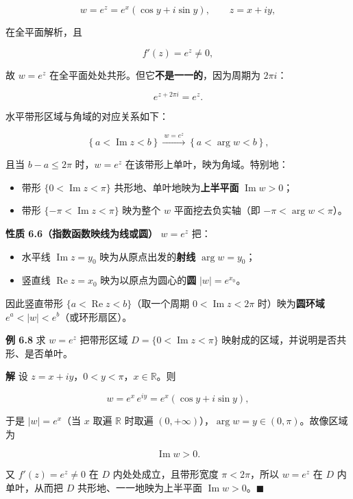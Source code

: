 \[
w=e^{z}=e^{x}(\cos y+i\sin y),\qquad z=x+iy,
\]

在全平面解析，且

\[
f'(z)=e^{z}\neq 0,
\]

故 \(w=e^z\) 在全平面处处共形。但它\textbf{不是一一的}，因为周期为
\(2\pi i\)：

\[
e^{z+2\pi i}=e^{z}.
\]

水平带形区域与角域的对应关系如下：

\[
\left\{a<\operatorname{Im}z<b\right\}
\xrightarrow{\ w=e^{z}\ }
\left\{a<\arg w<b\right\},
\]

且当 \(b-a\le 2\pi\) 时，\(w=e^{z}\) 在该带形上单叶，映为角域。特别地：

\begin{itemize}
\tightlist
\item
  带形 \(\{0<\operatorname{Im}z<\pi\}\)
  共形地、单叶地映为\textbf{上半平面} \(\operatorname{Im}w>0\)；
\item
  带形 \(\{-\pi<\operatorname{Im}z<\pi\}\) 映为整个 \(w\)
  平面挖去负实轴（即 \(-\pi<\arg w<\pi\)）。
\end{itemize}

\textbf{性质 6.6（指数函数映线为线或圆）} \(w=e^z\) 把：

\begin{itemize}
\tightlist
\item
  水平线 \(\operatorname{Im}z=y_0\) 映为从原点出发的\textbf{射线}
  \(\arg w=y_0\)；
\item
  竖直线 \(\operatorname{Re}z=x_0\) 映为以原点为圆心的\textbf{圆}
  \(|w|=e^{x_0}\)。
\end{itemize}

因此竖直带形 \(\{a<\operatorname{Re}z<b\}\)（取一个周期
\(0<\operatorname{Im}z<2\pi\) 时）映为\textbf{圆环域}
\(e^{a}<|w|<e^{b}\)（或环形扇区）。

\textbf{例 6.8} 求 \(w=e^{z}\) 把带形区域
\(D=\{0<\operatorname{Im}z<\pi\}\)
映射成的区域，并说明是否共形、是否单叶。

\textbf{解} 设 \(z=x+iy\)，\(0<y<\pi\)，\(x\in\mathbb{R}\)。则

\[
w=e^{x}\,e^{iy}=e^{x}(\cos y+i\sin y),
\]

于是 \(|w|=e^{x}\)（当 \(x\) 取遍 \(\mathbb{R}\) 时取遍
\((0,+\infty)\)），\(\arg w=y\in(0,\pi)\)。故像区域为

\[
\operatorname{Im}w>0 .
\]

又 \(f'(z)=e^{z}\neq 0\) 在 \(D\) 内处处成立，且带形宽度
\(\pi<2\pi\)，所以 \(w=e^z\) 在 \(D\) 内单叶，从而把 \(D\)
共形地、一一地映为上半平面 \(\operatorname{Im}w>0\)。\(\blacksquare\)

